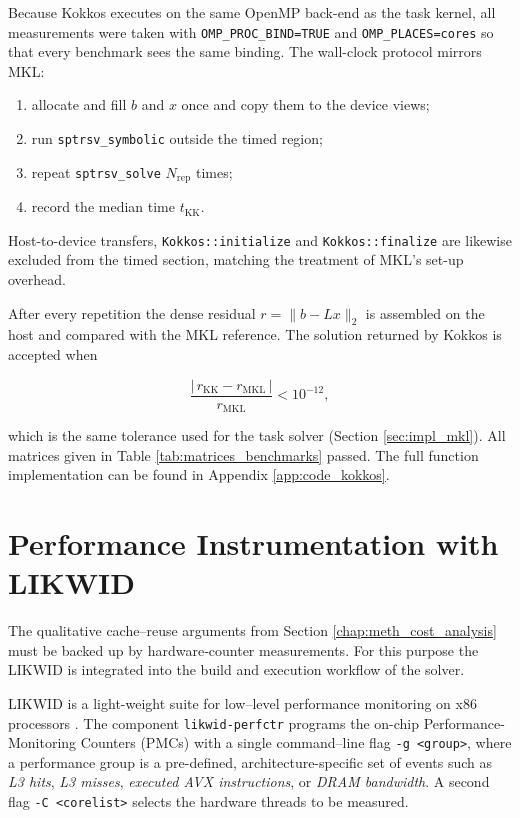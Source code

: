 Because Kokkos executes on the same OpenMP back-end as the task kernel,
all measurements were taken with \verb|OMP_PROC_BIND=TRUE| and
\verb|OMP_PLACES=cores| so that every benchmark sees the same binding.
The wall-clock protocol mirrors MKL:

\begin{enumerate}
  \item allocate and fill $b$ and $x$ once and copy them to the
        device views;
  \item run \texttt{sptrsv\_symbolic} outside the timed region;
  \item repeat \texttt{sptrsv\_solve} $N_{\mathrm{rep}}$ times;
  \item record the median time $t_{\mathrm{KK}}$.
\end{enumerate}

Host-to-device transfers, \texttt{Kokkos::initialize} and
\texttt{Kokkos::finalize} are likewise excluded from the timed section,
matching the treatment of MKL’s set-up overhead.

After every repetition the dense residual
$r = \|b-Lx\|_2$ is assembled on the host and compared with the MKL
reference.  The solution returned by Kokkos is accepted when

\[
  \frac{|\,r_{\mathrm{KK}}-r_{\mathrm{MKL}}\,|}{r_{\mathrm{MKL}}}
  < 10^{-12},
\]

which is the same tolerance used for the task solver
(Section \ref{sec:impl_mkl}).  All matrices given in Table \ref{tab:matrices_benchmarks} passed.
The full function implementation can be found in Appendix \ref{app:code_kokkos}.
\section{Performance Instrumentation with LIKWID}
\label{sec:impl_likwid}
The qualitative cache–reuse arguments from
Section \ref{chap:meth_cost_analysis} must be backed up by
hardware‐counter measurements. For this purpose the LIKWID is integrated
into the build and execution workflow of the solver.

LIKWID is a light-weight
suite for low–level performance monitoring on x86 processors \cite{gruber_likwid_2024}.
The component \texttt{likwid-perfctr} programs the on-chip
Performance-Monitoring Counters (PMCs) with a single command–line flag
\texttt{-g~<group>}, where a performance group is a
pre-defined, architecture-specific set of events such as
\emph{L3 hits}, \emph{L3 misses}, \emph{executed AVX instructions},
or \emph{DRAM bandwidth}.  
A second flag \texttt{-C~<corelist>} selects the hardware threads to
be measured.


